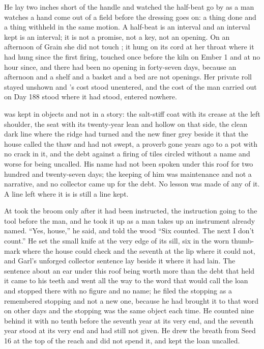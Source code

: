 He lay two inches short of the handle and watched the half-beat go by as a man watches a hand come out of a field before the dressing goes on: a thing done and a thing withheld in the same motion. A half-beat is an interval and an interval kept is an interval; it is not a promise, not a key, not an opening. On an afternoon of Grain she did not touch ; it hung on its cord at her throat where it had hung since the first firing, touched once before the kiln on Ember 1 and at no hour since, and there had been no opening in forty-seven days, because an afternoon and a shelf and a basket and a bed are not openings. Her private roll stayed unshown and 's cost stood unentered, and the cost of the man carried out on Day 188 stood where it had stood, entered nowhere.

 was kept in objects and not in a story: the salt-stiff coat with its crease at the left shoulder, the seat with its twenty-year lean and hollow on that side, the clean dark line where the ridge had turned and the new finer grey beside it that the house called the thaw and had not swept, a proverb gone years ago to a pot with no crack in it, and the debt against a firing of tiles circled without a name and worse for being uncalled. His name had not been spoken under this roof for two hundred and twenty-seven days; the keeping of him was maintenance and not a narrative, and no collector came up  for the debt. No lesson was made of any of it. A line left where it is is still a line kept.

At   took the broom only after it had been instructed, the instruction going to the tool before the man, and he took it up as a man takes up an instrument already named. “Yes, house,” he said, and told the wood “Six counted. The next I don't count.” He set the small knife at the very edge of its sill, six in the worn thumb-mark where the house could check and the seventh at the lip where it could not, and Garl's unforged collector sentence lay beside it where it had lain. The sentence about an ear under this roof being worth more than the debt that held it came to his teeth and went all the way to the word that would call the loan and stopped there with no figure and no name; he filed the stopping as a remembered stopping and not a new one, because he had brought it to that word on other days and the stopping was the same object each time. He counted nine behind it with no tenth before the seventh year at its very end, and the seventh year stood at its very end and had still not given. He drew the breath from Seed 16 at the top of the reach and did not spend it, and kept the loan uncalled.

